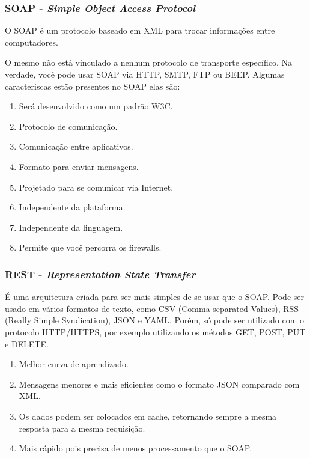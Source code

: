 \documentclass[12pt]{article}
\begin{document}
\subsubsection{SOAP - \textit{Simple Object Access Protocol}}

O SOAP é um protocolo baseado em XML para trocar informações entre computadores.

O mesmo não está vinculado a nenhum protocolo de transporte específico. Na verdade, você pode usar SOAP via HTTP, SMTP, FTP ou BEEP. 
Algumas caracteriscas estão presentes no SOAP elas são:
\begin{enumerate}
	\item Será desenvolvido como um padrão W3C.
	\item Protocolo de comunicação.
	\item Comunicação entre aplicativos.
	\item Formato para enviar mensagens.
	\item Projetado para se comunicar via Internet.
	\item Independente da plataforma.
	\item Independente da linguagem.
	\item Permite que você percorra os firewalls.
\end{enumerate}
\subsubsection{REST - \textit{Representation State Transfer}}
É uma arquitetura criada para ser mais simples de se usar que o SOAP. Pode ser usado em vários formatos de texto, como CSV (Comma-separated Values), RSS (Really Simple Syndication), JSON e YAML. Porém, só pode ser utilizado com o protocolo HTTP/HTTPS, por exemplo utilizando os métodos GET, POST, PUT e DELETE. 

\begin{enumerate}
	\item Melhor curva de aprendizado.
	\item Mensagens menores e mais eficientes como o formato JSON comparado com XML.
	\item Os dados podem ser colocados em cache, retornando sempre a mesma resposta para a mesma requisição.
	\item Mais rápido pois precisa de menos processamento que o SOAP.
\end{enumerate}
 
 
\end{document}
